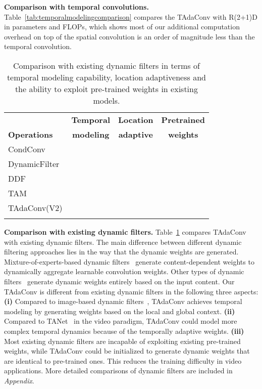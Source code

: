 \documentclass[10pt,journal,compsoc]{IEEEtran}
\newcommand{\cmark}{\color{good}\ding{51}}\newcommand{\xmark}{\color{bad}\ding{55}}
\newcommand{\tablestyle}[2]{\setlength{\tabcolsep}{#1}\renewcommand{\arraystretch}{#2}\centering\small}
\newcommand\graycell[0]{\cellcolor{midgrey}}
\begin{document}
\textbf{Comparison with temporal convolutions.} Table~\ref{tab:temporalmodelingcomparison} compares the TAdaConv with R(2+1)D in parameters and FLOPs, which shows most of our additional computation overhead on top of the spatial convolution is an order of magnitude less than the temporal convolution. 

\begin{table}[b]
\tablestyle{5pt}{1.0}
\caption{Comparison with existing dynamic filters in terms of temporal modeling capability, location adaptiveness and the ability to exploit pre-trained weights in existing models.}
\label{tab:compdyconv}
\centering
\begin{tabular}{lccc}
\shline
~ &  \textbf{Temporal} &  \textbf{Location} & \textbf{Pretrained}\\
\textbf{Operations} &  \textbf{modeling} &  \textbf{adaptive} & \textbf{weights}\\
\hline
 CondConv~\cite{condconv} & \xmark & \xmark & \xmark \\
 DynamicFilter~\cite{dynamicfilter} & \xmark & \xmark & \xmark \\
 DDF~\cite{ddf} & \xmark & \cmark & \xmark \\
 TAM~\cite{tam} & \cmark & \xmark & \xmark \\
 \graycell TAdaConv(V2) & \graycell\cmark & \graycell\cmark & \graycell\cmark \\
\shline
\end{tabular}
\end{table}

\textbf{Comparison with existing dynamic filters.} Table~\ref{tab:compdyconv} compares TAdaConv with existing dynamic filters. 
The main difference between different dynamic filtering approaches lies in the way that the dynamic weights are generated. 
Mixture-of-experts-based dynamic filters~\cite{condconv} generate content-dependent weights to dynamically aggregate learnable convolution weights.
Other types of dynamic filters~\cite{dynamicfilter,ddf,tam} generate dynamic weights entirely based on the input content. 
Our TAdaConv is different from existing dynamic filters in the following three aspects:
\textbf{(i)} Compared to image-based dynamic filters~\cite{dynamicfilter,ddf,condconv}, TAdaConv achieves temporal modeling by generating weights based on the local and global context. 
\textbf{(ii)} Compared to TANet~\cite{tam} in the video paradigm, TAdaConv could model more complex temporal dynamics because of the temporally adaptive weights. 
\textbf{(iii)} Most existing dynamic filters are incapable of exploiting existing pre-trained weights, while TAdaConv could be initialized to generate dynamic weights that are identical to pre-trained ones. This reduces the training difficulty in video applications.
More detailed comparisons of dynamic filters are included in \textit{Appendix}.
\end{document}

